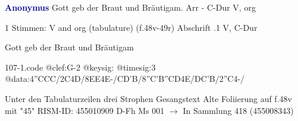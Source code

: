 \documentclass[twocolumn]{book}
\begin{document}
\newline \par \vspace{7pt} \textcolor{darkblue}{\textbf{Anonymus  }}
\newline Gott geb der Braut und Bräutigam. Arr - C-Dur
\newline V, org
\newline \begin{itshape}\end{itshape} 
\newline \textcolor{darkblue}{}  1 Stimmen: V and org (tabulature)  (f.48v-49r)
\newline Abschrift
.1  V, C-Dur
\newline \begin{footnotesize} Gott geb der Braut und Bräutigam \end{footnotesize}  
\begin{filecontents*}{107-1.code}
@clef:G-2
@keysig:
@timesig:3
@data:4''CCC/2C4D/{8EE}4E-/CD'B/{8''C'B''CD}4E/DC'B/2''C4-/
\end{filecontents*}
\newline
%
\newline Unter den Tabulaturzeilen drei Strophen Gesangstext
\newline Alte Foliierung auf f.48v mit "45"
\newline RISM-ID: 455010909
\newline D-Fh  Ms 001
\newline $\rightarrow$ In Sammlung 418 (455008343)
      
\end{document}
